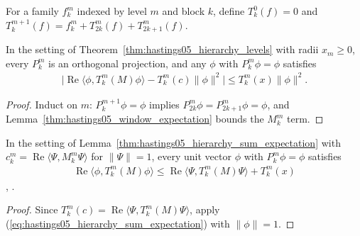 \begin{definition}
    \label{def:hastings05_hierarchy_sum}
    \leanok
    For a family $f_k^m$ indexed by level $m$ and block $k$, define
    $T_k^0(f)=0$ and $T_k^{m+1}(f)=f_k^m+T_{2k}^m(f)+T_{2k+1}^m(f)$.
\end{definition}

\begin{lemma}
    \label{thm:hastings05_hierarchy_sum_expectation}
    \leanok
    In the setting of Theorem~\ref{thm:hastings05_hierarchy_levels} with radii
    $x_m\ge0$, every $P_k^m$ is an orthogonal projection, and any $\phi$ with
    $P_k^m\phi=\phi$ satisfies
    \begin{align}
        \bigl|\operatorname{Re}\langle\phi,T_k^m(M)\phi\rangle
        -T_k^m(c)\|\phi\|^2\bigr|\le T_k^m(x)\|\phi\|^2.
        \label{eq:hastings05_hierarchy_sum_expectation}
    \end{align}
\end{lemma}
\begin{proof}\leanok
    Induct on $m$: $P_k^{m+1}\phi=\phi$ implies $P_{2k}^m\phi=P_{2k+1}^m\phi=\phi$,
    and Lemma~\ref{thm:hastings05_window_expectation} bounds the $M_k^m$ term.
\end{proof}

\begin{theorem}
    \label{thm:hastings05_hchy_every_state}
    \leanok
    In the setting of Lemma~\ref{thm:hastings05_hierarchy_sum_expectation}
    with $c_k^m=\operatorname{Re}\langle\Psi,M_k^m\Psi\rangle$ for $\|\Psi\|=1$,
    every unit vector $\phi$ with $P_k^m\phi=\phi$ satisfies
    \begin{align}
        \operatorname{Re}\langle\phi,T_k^m(M)\phi\rangle
        \le\operatorname{Re}\langle\Psi,T_k^m(M)\Psi\rangle+T_k^m(x)
        \label{eq:hastings05_hchy_every_state}
    \end{align}
    \cite[eq.~(hchy), lines 709--720]{Hastings2006Solving},
    \cite{gap:hastings05_hierarchical_energy}.
\end{theorem}
\begin{proof}\leanok
    Since $T_k^m(c)=\operatorname{Re}\langle\Psi,T_k^m(M)\Psi\rangle$, apply
    (\ref{eq:hastings05_hierarchy_sum_expectation}) with $\|\phi\|=1$.
\end{proof}

